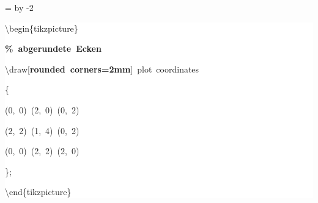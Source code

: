 \begingroup
\ttfamily
{}
=\textwidth
\advance{} by -2\fboxsep
\noindent
\colorbox{background}
{%
\parbox{\dimen255}
{%
\rule[-0.5ex]{0pt}{2.5ex}\hspace*{0.0em}\textbackslash{}begin\{tikzpicture\}\\
\rule[-0.5ex]{0pt}{2.5ex}\hspace*{1.0em}\textcolor{G}{\textbf{\%~abgerundete~Ecken}}\\
\rule[-0.5ex]{0pt}{2.5ex}\hspace*{1.0em}\textbackslash{}draw[\textcolor{R}{\textbf{rounded~corners=2mm}}]~plot~coordinates\\
\rule[-0.5ex]{0pt}{2.5ex}\hspace*{1.0em}\{\\
\rule[-0.5ex]{0pt}{2.5ex}\hspace*{2.0em}(0,~0)~(2,~0)~(0,~2)\\
\rule[-0.5ex]{0pt}{2.5ex}\hspace*{2.0em}(2,~2)~(1,~4)~(0,~2)\\
\rule[-0.5ex]{0pt}{2.5ex}\hspace*{2.0em}(0,~0)~(2,~2)~(2,~0)\\
\rule[-0.5ex]{0pt}{2.5ex}\hspace*{1.0em}\};\\
\rule[-0.5ex]{0pt}{2.5ex}\hspace*{0.0em}\textbackslash{}end\{tikzpicture\}}%
}%
\endgroup
